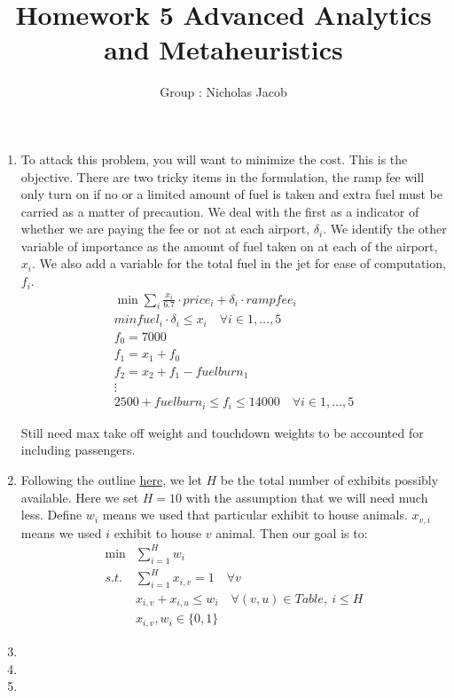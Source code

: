 \documentclass[11pt]{article}
\author{Group : Nicholas Jacob}
\title{Homework 5 Advanced Analytics and Metaheuristics}
\begin{document}
\maketitle

\begin{enumerate}
\item To attack this problem, you will want to minimize the cost.  This is the objective.  There are two tricky items in the formulation, the ramp fee will only turn on if no or a limited amount of fuel is taken and extra fuel must be carried as a matter of precaution.  We deal with the first as a indicator of whether we are paying the fee or not at each airport, $\delta_i$.  We identify the other variable of importance as the amount of fuel taken on at each of the airport, $x_i$.  We also add a variable for the total fuel in the jet for ease of computation, $f_i$.
\begin{eqnarray}
\min \sum_{i}\frac{x_i}{6.7}\cdot price_i + \delta_i\cdot rampfee_i\\
minfuel_i\cdot\delta_i\leq x_i\quad \forall i\in {1,\dots ,5}\\
f_0 = 7000\\
f_1 = x_1 + f_0\\
f_2 = x_2 + f_1 - fuelburn_1\\
\vdots\\
2500 + fuelburn_i \leq f_i \leq 14000\quad \forall i \in {1,\dots ,5}
\end{eqnarray}

Still need max take off weight and touchdown weights to be accounted for including passengers.

\item Following the outline \href{https://math.stackexchange.com/questions/4594715/vertex-coloring-approximation-algorithm-using-linear-programming}{here}, 
we let $H$ be the total number of exhibits possibly available.  Here we set $H = 10$ with the assumption that we will need much less. Define $w_i$ means we used that particular exhibit to house animals.  $x_{v,i}$ means we used $i$ exhibit to house $v$ animal.  Then our goal is to:
\begin{eqnarray}
\min &\sum_{i=1}^H w_i\\
s.t.& \sum_{i=1}^Hx_{i,v} = 1\quad \forall v\\
& x_{i,v} + x_{i,u} \leq w_i\quad \forall (v,u)\in Table, \ i\leq H\\
&x_{i,v},w_i\in \{0,1\}
\end{eqnarray}
\item
\item 
\item 


\end{enumerate}
\end{document}
